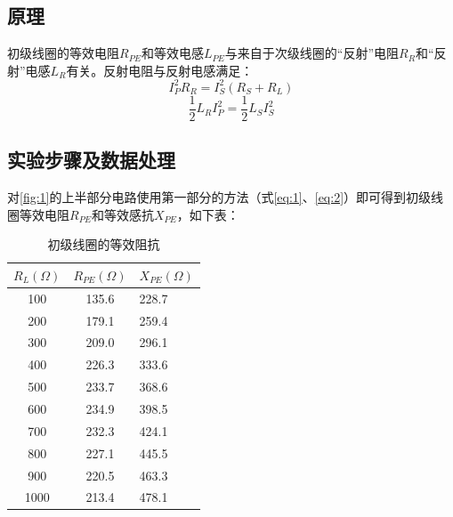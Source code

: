 \documentclass[12pt]{article}
\begin{document}
\subsection*{原理}
初级线圈的等效电阻$R_{PE}$和等效电感$L_{PE}$与来自于次级线圈的“反射”电阻$R_{R}$和“反射”电感$L_R$有关。反射电阻与反射电感满足：
\begin{equation}
    I_P^2R_R=I_S^2(R_S+R_L)
    \label{eq:5}
\end{equation}
\begin{equation}
    \frac{1}{2}L_RI_P^2=\frac{1}{2}L_SI_S^2
    \label{eq:6}
\end{equation}

\subsection*{实验步骤及数据处理}
对\ref{fig:1}的上半部分电路使用第一部分的方法（式\ref{eq:1}、\ref{eq:2}）即可得到初级线圈等效电阻$R_{PE}$和等效感抗$X_{PE}$，如下表：
\begin{table}[H]
    \centering
    \begin{tabular}{|c|c|l|}
    \hline
    \multicolumn{1}{|l|}{$R_L(\Omega)$} & \multicolumn{1}{l|}{$R_{PE}(\Omega)$} & $X_{PE}(\Omega)$ \\ \hline
    100                                 & 135.6                                 & 228.7            \\ \hline
    200                                 & 179.1                                 & 259.4            \\ \hline
    300                                 & 209.0                                 & 296.1            \\ \hline
    400                                 & 226.3                                 & 333.6            \\ \hline
    500                                 & 233.7                                 & 368.6            \\ \hline
    600                                 & 234.9                                 & 398.5            \\ \hline
    700                                 & 232.3                                 & 424.1            \\ \hline
    800                                 & 227.1                                 & 445.5            \\ \hline
    900                                 & 220.5                                 & 463.3            \\ \hline
    1000                                & 213.4                                 & 478.1            \\ \hline
    \end{tabular}
    \caption{初级线圈的等效阻抗}
    \label{tab:3}
    \end{table}
\end{document}
